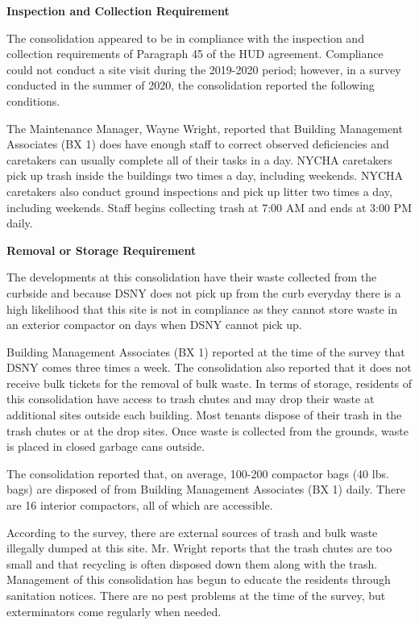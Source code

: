 

\textbf{Inspection and Collection Requirement}

The consolidation appeared to be in compliance with the inspection and collection requirements of Paragraph 45 of the HUD agreement. Compliance could not conduct a site visit during the 2019-2020 period; however, in a survey conducted in the summer of 2020, the consolidation reported the following conditions.

The Maintenance Manager, Wayne Wright, reported that Building Management Associates (BX 1) does have enough staff to correct observed deficiencies and caretakers can usually complete all of their tasks in a day. NYCHA caretakers pick up trash inside the buildings two times a day, including weekends. NYCHA caretakers also conduct ground inspections and pick up litter two times a day, including weekends. Staff begins collecting trash at 7:00 AM and ends at 3:00 PM daily. 

\textbf{Removal or Storage Requirement}

The developments at this consolidation have their waste collected from the curbside and because DSNY does not pick up from the curb everyday there is a high likelihood that this site is not in compliance as they cannot store waste in an exterior compactor on days when DSNY cannot pick up.

Building Management Associates (BX 1) reported at the time of the survey that DSNY comes three times a week. The consolidation also reported that it does not receive bulk tickets for the removal of bulk waste. In terms of storage, residents of this consolidation have access to trash chutes and may drop their waste at additional sites outside each building. Most tenants dispose of their trash in the trash chutes or at the drop sites. Once waste is collected from the grounds, waste is placed in closed garbage cans outside. 

The consolidation reported that, on average, 100-200 compactor bags (40 lbs. bags) are disposed of from Building Management Associates (BX 1) daily. There are 16 interior compactors, all of which are accessible. 

According to the survey, there are external sources of trash and bulk waste illegally dumped at this site. Mr. Wright reports that the trash chutes are too small and that recycling is often disposed down them along with the trash. Management of this consolidation has begun to educate the residents through sanitation notices. There are no pest problems at the time of the survey, but exterminators come regularly when needed.